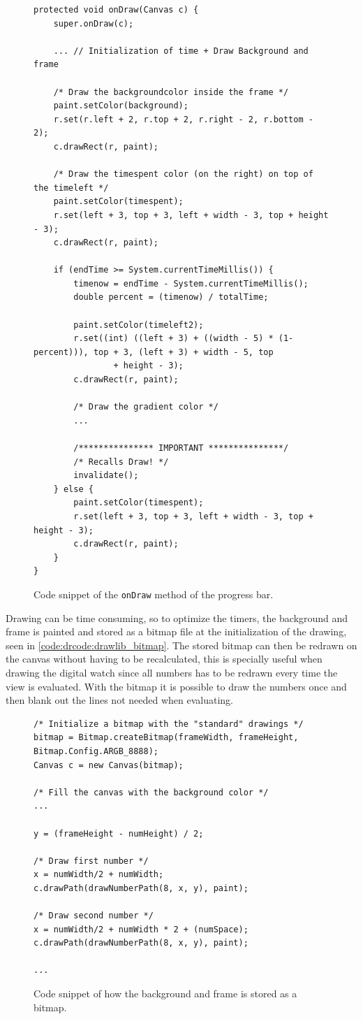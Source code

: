 \begin{figure}[H]%
\begin{lstlisting}
protected void onDraw(Canvas c) {
	super.onDraw(c);
	
	... // Initialization of time + Draw Background and frame

	/* Draw the backgroundcolor inside the frame */
	paint.setColor(background);
	r.set(r.left + 2, r.top + 2, r.right - 2, r.bottom - 2);
	c.drawRect(r, paint);

	/* Draw the timespent color (on the right) on top of the timeleft */
	paint.setColor(timespent);
	r.set(left + 3, top + 3, left + width - 3, top + height - 3);
	c.drawRect(r, paint);

	if (endTime >= System.currentTimeMillis()) {
		timenow = endTime - System.currentTimeMillis();
		double percent = (timenow) / totalTime;

		paint.setColor(timeleft2);
		r.set((int) ((left + 3) + ((width - 5) * (1-percent))), top + 3, (left + 3) + width - 5, top
				+ height - 3);
		c.drawRect(r, paint);

		/* Draw the gradient color */
		...

		/*************** IMPORTANT ***************/
		/* Recalls Draw! */
		invalidate();
	} else {
		paint.setColor(timespent);
		r.set(left + 3, top + 3, left + width - 3, top + height - 3);
		c.drawRect(r, paint);
	}
}
\end{lstlisting}
\caption{Code snippet of the \texttt{onDraw} method of the progress bar.}%
\label{code:backend_drawlib_onDraw}%
\end{figure}

Drawing can be time consuming, so to optimize the timers, the background and frame is painted and stored as a bitmap file at the initialization of the drawing, seen in \autoref{code:drcode:drawlib_bitmap}.
The stored bitmap can then be redrawn on the canvas without having to be recalculated, this is specially useful when drawing the digital watch since all numbers has to be redrawn every time the view is evaluated.
With the bitmap it is possible to draw the numbers once and then blank out the lines not needed when evaluating.

\begin{figure}%
\begin{lstlisting}
/* Initialize a bitmap with the "standard" drawings */
bitmap = Bitmap.createBitmap(frameWidth, frameHeight, Bitmap.Config.ARGB_8888);
Canvas c = new Canvas(bitmap);

/* Fill the canvas with the background color */
...

y = (frameHeight - numHeight) / 2;

/* Draw first number */
x = numWidth/2 + numWidth;
c.drawPath(drawNumberPath(8, x, y), paint);

/* Draw second number */
x = numWidth/2 + numWidth * 2 + (numSpace);
c.drawPath(drawNumberPath(8, x, y), paint);

...
\end{lstlisting}
\caption{Code snippet of how the background and frame is stored as a bitmap.}%
\label{code:drcode:drawlib_bitmap}%
\end{figure}